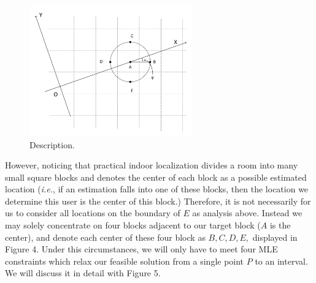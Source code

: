 \documentclass[10pt,conference,compsocconf,letterpaper]{IEEEtran}
\newcommand{\ie}{{\em i.e.}}
\begin{document}
\begin{figure}[!htbp]
\centering
\includegraphics [width = 7cm]{Figure4.pdf}
\caption{Description.}
\label{fig:4}
\end{figure}

However, noticing that practical indoor localization divides a room into many small square blocks and denotes the center of each block as a possible estimated location (\ie, if an estimation falls into one of these blocks, then the location we determine this user is the center of this block.) Therefore, it is not necessarily for us to consider all locations on the boundary of $E$ as analysis above. Instead we may solely concentrate on four blocks adjacent to our target block ($A$ is the center), and denote each center of these four block as $B, C, D, E,$ displayed in Figure 4. Under this circumstances, we will only have to meet four MLE constraints which relax our feasible solution from a single point $P$ to an interval. We will discuss it in detail with Figure 5.
\end{document}
